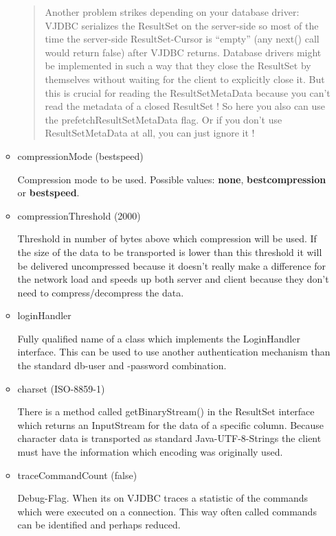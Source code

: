 \documentclass[10pt,a4paper,english]{article}
\begin{document}
\begin{itemize}
\begin{itemize}
\begin{quote}
\begin{center}
\begin{sffamily}
{{Another problem strikes depending on your database driver: VJDBC serializes the ResultSet on the server-side so most of the time the server-side ResultSet-Cursor is ``empty'' (any next() call would return false) after VJDBC returns. Database drivers might be implemented in such a way that they close the ResultSet by themselves without waiting for the client to explicitly close it. But this is crucial for reading the ResultSetMetaData because you can't read the metadata of a closed ResultSet ! So here you also can use the prefetchResultSetMetaData flag. Or if you don't use ResultSetMetaData at all, you can just ignore it !
}}
\end{sffamily}
\end{center}
\end{quote}

\item {} 
compressionMode (bestspeed)

Compression mode to be used. Possible values: \textbf{none}, \textbf{bestcompression} or \textbf{bestspeed}.

\item {} 
compressionThreshold (2000)

Threshold in number of bytes above which compression will be used. If the size of the data to be transported is lower than this threshold it will be delivered uncompressed because it doesn't really make a difference for the network load and speeds up both server and client because they don't need to compress/decompress the data.

\item {} 
loginHandler

Fully qualified name of a class which implements the LoginHandler interface. This can be used to use another authentication mechanism than the standard db-user and -password combination.

\item {} 
charset (ISO-8859-1)

There is a method called getBinaryStream() in the ResultSet interface which returns an InputStream for the data of a specific column. Because character data is transported as standard Java-UTF-8-Strings the client must have the information which encoding was originally used.

\item {} 
traceCommandCount (false)

Debug-Flag. When its on VJDBC traces a statistic of the commands which were executed on a connection. This way often called commands can be identified and perhaps reduced.


\end{itemize}
\end{itemize}
\end{document}
